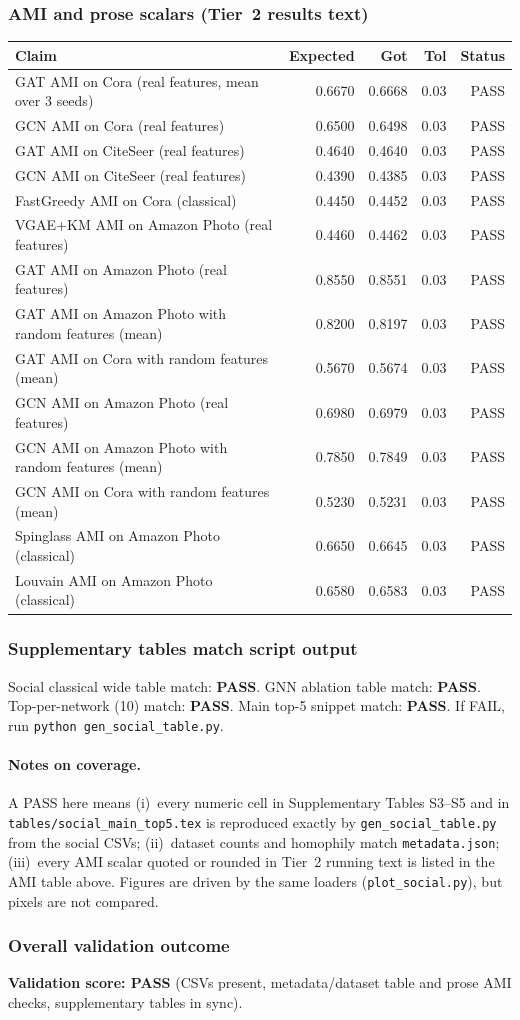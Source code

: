 \subsubsection{AMI and prose scalars (Tier~2 results text)}
\begin{tabular}{p{6.8cm}rrrr}
\toprule
Claim & Expected & Got & Tol & Status \\
\midrule
GAT AMI on Cora (real features, mean over 3 seeds) & 0.6670 & 0.6668 & 0.03 & PASS \\
GCN AMI on Cora (real features) & 0.6500 & 0.6498 & 0.03 & PASS \\
GAT AMI on CiteSeer (real features) & 0.4640 & 0.4640 & 0.03 & PASS \\
GCN AMI on CiteSeer (real features) & 0.4390 & 0.4385 & 0.03 & PASS \\
FastGreedy AMI on Cora (classical) & 0.4450 & 0.4452 & 0.03 & PASS \\
VGAE+KM AMI on Amazon Photo (real features) & 0.4460 & 0.4462 & 0.03 & PASS \\
GAT AMI on Amazon Photo (real features) & 0.8550 & 0.8551 & 0.03 & PASS \\
GAT AMI on Amazon Photo with random features (mean) & 0.8200 & 0.8197 & 0.03 & PASS \\
GAT AMI on Cora with random features (mean) & 0.5670 & 0.5674 & 0.03 & PASS \\
GCN AMI on Amazon Photo (real features) & 0.6980 & 0.6979 & 0.03 & PASS \\
GCN AMI on Amazon Photo with random features (mean) & 0.7850 & 0.7849 & 0.03 & PASS \\
GCN AMI on Cora with random features (mean) & 0.5230 & 0.5231 & 0.03 & PASS \\
Spinglass AMI on Amazon Photo (classical) & 0.6650 & 0.6645 & 0.03 & PASS \\
Louvain AMI on Amazon Photo (classical) & 0.6580 & 0.6583 & 0.03 & PASS \\
\bottomrule
\end{tabular}
\subsubsection{Supplementary tables match script output}
Social classical wide table match: \textbf{PASS}. GNN ablation table match: \textbf{PASS}. Top-per-network (10) match: \textbf{PASS}. Main top-5 snippet match: \textbf{PASS}. If FAIL, run \texttt{python gen\_social\_table.py}.
\paragraph{Notes on coverage.} A PASS here means (i)~every numeric cell in Supplementary Tables S3--S5 and in \texttt{tables/social\_main\_top5.tex} is reproduced exactly by \texttt{gen\_social\_table.py} from the social CSVs; (ii)~dataset counts and homophily match \texttt{metadata.json}; (iii)~every AMI scalar quoted or rounded in Tier~2 running text is listed in the AMI table above. Figures are driven by the same loaders (\texttt{plot\_social.py}), but pixels are not compared.
\subsubsection{Overall validation outcome}
\textbf{Validation score: PASS} (CSVs present, metadata/dataset table and prose AMI checks, supplementary tables in sync).